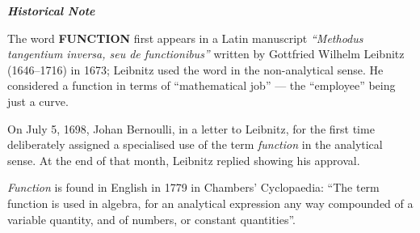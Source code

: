 \documentclass[11pt]{article}
\begin{document}
\begin{mdframed}[
  backgroundcolor=cyan!15,
  linecolor=cyan!40,
  linewidth=0pt,
  leftmargin=0pt,
  rightmargin=0pt,
  innerleftmargin=14pt,
  innerrightmargin=14pt,
  innertopmargin=12pt,
  innerbottommargin=12pt,
  skipabove=10pt,
  skipbelow=10pt
]

\begin{center}
\textcolor{cyan!60!black}{\textbf{\textit{Historical Note}}}
\end{center}

The word \textbf{FUNCTION} first appears in a Latin manuscript
\textit{``Methodus tangentium inversa, seu de functionibus''}
written by Gottfried Wilhelm Leibnitz (1646--1716) in 1673; Leibnitz
used the word in the non-analytical sense. He considered a function in
terms of ``mathematical job'' --- the ``employee'' being just a curve.

\medskip

On July 5, 1698, Johan Bernoulli, in a letter to Leibnitz, for the first
time deliberately assigned a specialised use of the term
\textit{function} in the analytical sense. At the end of that month,
Leibnitz replied showing his approval.

\medskip

\textit{Function} is found in English in 1779 in Chambers' Cyclopaedia:
``The term function is used in algebra, for an analytical expression any
way compounded of a variable quantity, and of numbers, or constant
quantities''.

\end{mdframed}

\begin{center}
\end{center}
\end{document}
